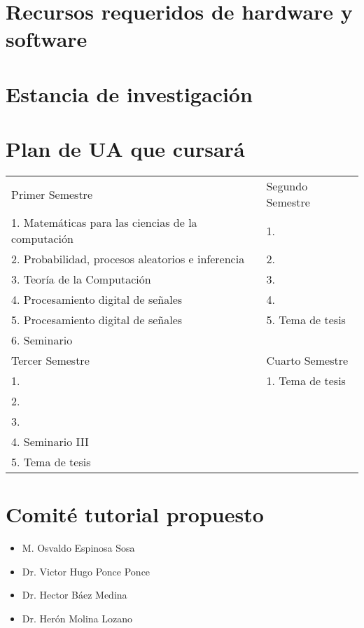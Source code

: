 \documentclass[runningheads,a4paper]{llncs}
\begin{document}
\section{Recursos requeridos de hardware y software}


\section{Estancia de investigación}

\section{Plan de UA que cursará}
\begin{table}
\begin{center}
 \begin{tabular}{|l|l|}
Primer Semestre & Segundo Semestre\\
1. Matemáticas para las ciencias de la computación & 1.\\
2. Probabilidad, procesos aleatorios e inferencia & 2.\\
3. Teoría de la Computación & 3.\\ 
4. Procesamiento digital de señales & 4.\\ 
5. Procesamiento digital de señales & 5. Tema de tesis\\ 
6. Seminario  \\
\hline\noalign{\smallskip}
Tercer Semestre & Cuarto Semestre\\
1. & 1. Tema de tesis\\
2. & \\
3. & \\
4. Seminario III& \\
5. Tema de tesis & \\
\hline
\end{tabular}
\end{center}
\end{table}

\section{Comité tutorial propuesto}
\begin{itemize}
\item M. Osvaldo Espinosa Sosa
\item Dr. Victor Hugo Ponce Ponce
\item Dr. Hector Báez Medina
\item Dr. Herón Molina Lozano
 \end{itemize}
\end{document}

